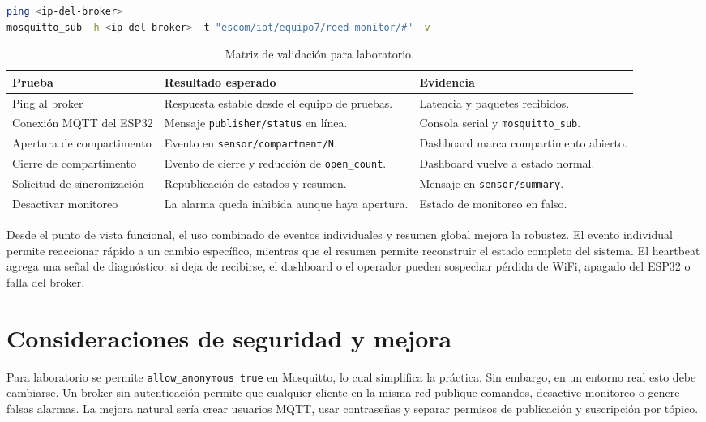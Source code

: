 \documentclass[12pt,letterpaper]{article}
\begin{document}
\begin{lstlisting}[language=bash,caption={Comandos sugeridos para validar MQTT.}]
ping <ip-del-broker>
mosquitto_sub -h <ip-del-broker> -t "escom/iot/equipo7/reed-monitor/#" -v
\end{lstlisting}

\begin{table}[H]
\centering
\caption{Matriz de validación para laboratorio.}
\begin{tabular}{p{}p{}p{}}
\toprule
\textbf{Prueba} & \textbf{Resultado esperado} & \textbf{Evidencia} \\
\midrule
Ping al broker & Respuesta estable desde el equipo de pruebas. & Latencia y paquetes recibidos. \\
Conexión MQTT del ESP32 & Mensaje \texttt{publisher/status} en línea. & Consola serial y \texttt{mosquitto\_sub}. \\
Apertura de compartimento & Evento en \texttt{sensor/compartment/N}. & Dashboard marca compartimento abierto. \\
Cierre de compartimento & Evento de cierre y reducción de \texttt{open\_count}. & Dashboard vuelve a estado normal. \\
Solicitud de sincronización & Republicación de estados y resumen. & Mensaje en \texttt{sensor/summary}. \\
Desactivar monitoreo & La alarma queda inhibida aunque haya apertura. & Estado de monitoreo en falso. \\
\bottomrule
\end{tabular}
\end{table}

Desde el punto de vista funcional, el uso combinado de eventos individuales y resumen global mejora la robustez. El evento individual permite reaccionar rápido a un cambio específico, mientras que el resumen permite reconstruir el estado completo del sistema. El heartbeat agrega una señal de diagnóstico: si deja de recibirse, el dashboard o el operador pueden sospechar pérdida de WiFi, apagado del ESP32 o falla del broker.

\section{Consideraciones de seguridad y mejora}

Para laboratorio se permite \texttt{allow\_anonymous true} en Mosquitto, lo cual simplifica la práctica. Sin embargo, en un entorno real esto debe cambiarse. Un broker sin autenticación permite que cualquier cliente en la misma red publique comandos, desactive monitoreo o genere falsas alarmas. La mejora natural sería crear usuarios MQTT, usar contraseñas y separar permisos de publicación y suscripción por tópico.
\end{document}

